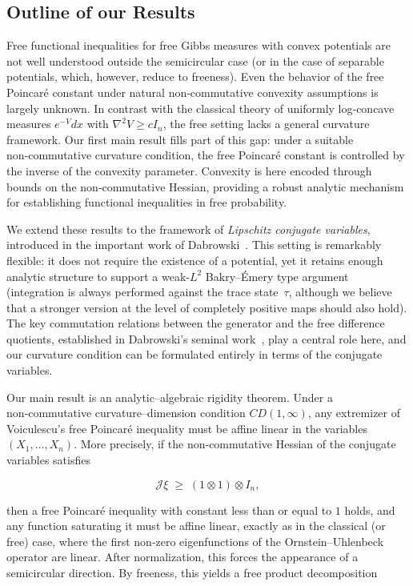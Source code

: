 \documentclass[10pt,a4paper,reqno]{amsart}
\begin{document}
\subsection{Outline of our Results}

Free functional inequalities for free Gibbs measures with convex potentials are not well understood
outside the semicircular case (or in the case of separable potentials, which, however, reduce to
freeness).  Even the behavior of the free Poincaré constant under natural non‑commutative convexity
assumptions is largely unknown.  In contrast with the classical theory of uniformly log‑concave
measures $e^{-V}dx$ with $\nabla^2V\ge cI_n$, the free setting lacks a general curvature framework.
Our first main result fills part of this gap: under a suitable non‑commutative curvature condition,
the free Poincaré constant is controlled by the inverse of the convexity parameter.  Convexity is
here encoded through bounds on the non‑commutative Hessian, providing a robust analytic mechanism for
establishing functional inequalities in free probability.
\par\vspace{0.5em}
We extend these results to the framework of \emph{Lipschitz conjugate variables}, introduced in the important work of
Dabrowski~\cite{Dab14}.  This setting is remarkably flexible: it does not require the existence of a
potential, yet it retains enough analytic structure to support a weak-$L^{2}$ Bakry--Émery type argument (integration is always performed against the trace state~$\tau$, although we believe that a stronger version at the level of completely positive maps should also hold).
  The key commutation
relations between the generator and the free difference quotients, established in Dabrowski’s
seminal work~\cite{Dab14}, play a central role here, and our curvature condition can be formulated
entirely in terms of the conjugate variables.
\par\vspace{0.5em}
Our main result is an analytic–algebraic rigidity theorem.  Under a non‑commutative
curvature–dimension condition $CD(1,\infty)$, any extremizer of Voiculescu’s free Poincar\'e
inequality must be affine linear in the variables $(X_1,\ldots,X_n)$.  More precisely, if the
non‑commutative Hessian of the conjugate variables satisfies


\[
\mathscr{J}\xi\;\ge\;(1\otimes 1)\otimes I_n,
\]


then a free Poincaré inequality with constant less than or equal to $1$ holds, and any function saturating it must be
affine linear, exactly as in the classical (or free) case, where the first non‑zero eigenfunctions of the
Ornstein--Uhlenbeck operator are linear.  After normalization, this forces the appearance of a
semicircular direction.  By freeness, this yields a free product decomposition
\end{document}
